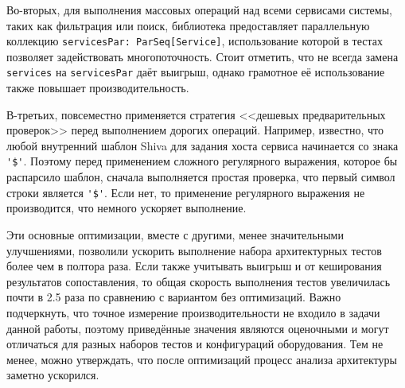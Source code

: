 Во-вторых, для выполнения массовых операций над всеми сервисами системы, таких как фильтрация или поиск, библиотека предоставляет параллельную коллекцию \verb|servicesPar: ParSeq[Service]|, использование которой в тестах позволяет задействовать многопоточность. Стоит отметить, что не всегда замена \verb|services| на \verb|servicesPar| даёт выигрыш, однако грамотное её использование также повышает производительность.

В-третьих, повсеместно применяется стратегия <<дешевых предварительных проверок>> перед выполнением дорогих операций. Например, известно, что любой внутренний шаблон Shiva для задания хоста сервиса начинается со знака \verb|'$'|. Поэтому перед применением сложного регулярного выражения, которое бы распарсило шаблон, сначала выполняется простая проверка, что первый символ строки является \verb|'$'|. Если нет, то применение регулярного выражения не производится, что немного ускоряет выполнение.

Эти основные оптимизации, вместе с другими, менее значительными улучшениями, позволили ускорить выполнение набора архитектурных тестов более чем в полтора раза. Если также учитывать выигрыш и от кеширования результатов сопоставления, то общая скорость выполнения тестов увеличилась почти в 2.5 раза по сравнению с вариантом без оптимизаций. Важно подчеркнуть, что точное измерение производительности не входило в задачи данной работы, поэтому приведённые значения являются оценочными и могут отличаться для разных наборов тестов и конфигураций оборудования. Тем не менее, можно утверждать, что после оптимизаций процесс анализа архитектуры заметно ускорился.
